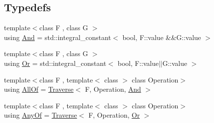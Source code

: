 \subsection*{Typedefs}
\begin{DoxyCompactItemize}
\item 
{\footnotesize template$<$class F , class G $>$ }\\using \hyperlink{namespaceFunG_1_1Meta_a6f0fce21e31ab8fdc307eddead3b8d66}{And} = std\-::integral\-\_\-constant$<$ bool, F\-::value \&\&G\-::value $>$
\item 
{\footnotesize template$<$class F , class G $>$ }\\using \hyperlink{namespaceFunG_1_1Meta_a54cebc5541fa7677e239a9b7a84aba7e}{Or} = std\-::integral\-\_\-constant$<$ bool, F\-::value$\vert$$\vert$G\-::value $>$
\item 
{\footnotesize template$<$class F , template$<$ class $>$ class Operation$>$ }\\using \hyperlink{namespaceFunG_1_1Meta_aa62ce805a20b342ffc1947c210be3501}{All\-Of} = \hyperlink{structFunG_1_1Meta_1_1Traverse}{Traverse}$<$ F, Operation, \hyperlink{namespaceFunG_1_1Meta_a6f0fce21e31ab8fdc307eddead3b8d66}{And} $>$
\item 
{\footnotesize template$<$class F , template$<$ class $>$ class Operation$>$ }\\using \hyperlink{namespaceFunG_1_1Meta_a54a94493bb1caa42606dd7e6744abf8c}{Any\-Of} = \hyperlink{structFunG_1_1Meta_1_1Traverse}{Traverse}$<$ F, Operation, \hyperlink{namespaceFunG_1_1Meta_a54cebc5541fa7677e239a9b7a84aba7e}{Or} $>$
\end{DoxyCompactItemize}


